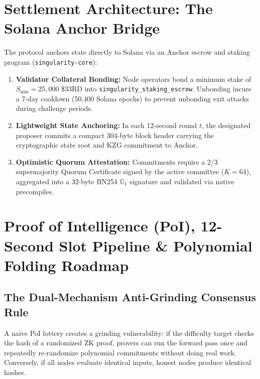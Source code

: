 \documentclass[10pt,twocolumn,letterpaper]{article}
\begin{document}
\section{Settlement Architecture: The Solana Anchor Bridge}
The protocol anchors state directly to Solana via an Anchor escrow and staking program (\texttt{singularity-core}):
\begin{enumerate}
    \item \textbf{Validator Collateral Bonding:} Node operators bond a minimum stake of $S_{\min} = 25,000$ \$33RD into \texttt{singularity\_staking\_escrow}. Unbonding incurs a 7-day cooldown (50,400 Solana epochs) to prevent unbonding exit attacks during challenge periods.
    \item \textbf{Lightweight State Anchoring:} In each 12-second round $t$, the designated proposer commits a compact 304-byte block header carrying the cryptographic state root and KZG commitment to Anchor.
    \item \textbf{Optimistic Quorum Attestation:} Commitments require a 2/3 supermajority Quorum Certificate signed by the active committee ($K = 64$), aggregated into a 32-byte BN254 $\mathbb{G}_1$ signature and validated via native precompiles.
\end{enumerate}

\section{Proof of Intelligence (PoI), 12-Second Slot Pipeline \& Polynomial Folding Roadmap}

\subsection{The Dual-Mechanism Anti-Grinding Consensus Rule}
A naive PoI lottery creates a grinding vulnerability: if the difficulty target checks the hash of a randomized ZK proof, provers can run the forward pass once and repeatedly re-randomize polynomial commitments without doing real work. Conversely, if all nodes evaluate identical inputs, honest nodes produce identical hashes.
\end{document}
